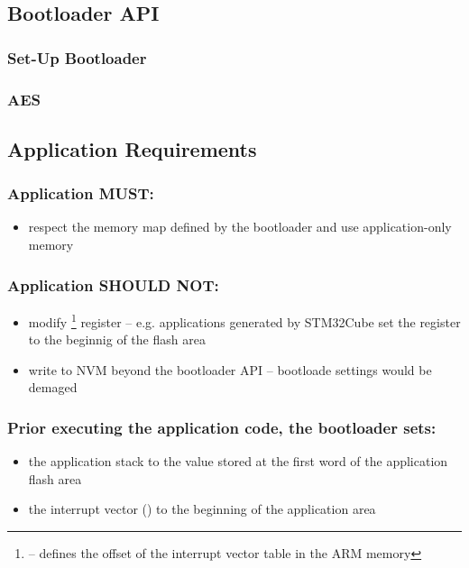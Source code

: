  
\clearpage
\subsection{Bootloader API} \label{sec:arch:api}
\subsubsection*{Set-Up Bootloader}

\subsubsection*{AES}


\clearpage
\subsection{Application Requirements}
\subsubsection*{Application MUST:}
\begin{itemize}
  \item respect the memory map defined by the bootloader and use application-only memory
\end{itemize}

\subsubsection*{Application SHOULD NOT:}
\begin{itemize}
  \item modify \footnote{ -- defines the offset of the interrupt vector table in the ARM memory} register -- e.g. applications generated by STM32Cube set the  register to the beginnig of the flash area
  \item write to NVM beyond the bootloader API -- bootloade settings would be demaged
\end{itemize}

\subsubsection*{Prior executing the application code, the bootloader sets:}
\begin{itemize}
  \item the application stack to the value stored at the first word of the application flash area
  \item the interrupt vector () to the beginning of the application area
\end{itemize}

